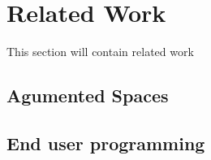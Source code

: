 \section{Related Work} %
\label{sec:related_work}
This section will contain related work

\subsection{Agumented Spaces} %
\label{sub:agumented_spaces}


\subsection{End user programming} %
\label{sub:end_user_programming}

